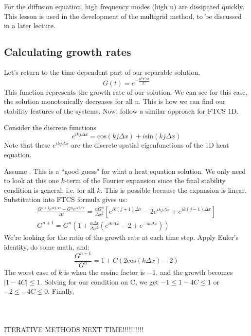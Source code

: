 \documentclass[11pt]{article}
\begin{document}
For the diffusion equation, high frequency modes (high n) are dissipated quickly. This lesson is used in the development of the multigrid method, to be discussed in a later lecture.

\subsection{Calculating growth rates}
Let's return to the time-dependent part of our separable solution,
$$ G(t) = e^{-\frac{n^2\pi^2\alpha t}{L^2}} $$
This function represents the growth rate of our solution. We can see for this case, the solution monotonically decreases for all n. This is how we can find our stability features of the systems. Now, follow a similar approach for FTCS 1D.

Consider the discrete functions
\begin{equation}
e^{ikj\Delta x} = \text{cos}(kj\Delta x) + i\text{sin}(kj\Delta x)
\end{equation}
Note that these $e^{ikj\Delta x}$ are the discrete spatial eigenfunctions of the 1D heat equation.  

Assume . This is a ``good guess" for what a heat equation solution. We only need to look at this one $k$-term of the Fourier expansion since the final stability condition is general, i.e. for all $k$.  This is possible because the expansion is linear. Substitution into FTCS formula gives us:
\begin{eqnarray}
\frac{G^{n+1}e^{ikj\Delta x} - G^ne^{ikj\Delta x} }{\Delta t} = \frac{\alpha G^n}{\Delta x^2}  [e^{ik(j+1)\Delta x} -2e^{ikj\Delta x}  + e^{ik(j-1)\Delta x} ] \\
G^{n+1} = G^n(1 + \frac{\alpha \Delta t}{\Delta x^2}  (e^{ik\Delta x} -2  + e^{-ik\Delta x} ))
\end{eqnarray}
We're looking for the ratio of the growth rate at each time step. Apply Euler's identity, do some math, and:
$$ \frac{G^{n+1}}{G^n} = 1+C(2\text{cos}(k\Delta x) - 2) $$
The worst case of $k$ is when the cosine factor is $-1$, and the growth becomes $|1-4C| \leq 1$. Solving for our condition on C, we get $ -1 \leq 1-4C \leq 1$ or $-2 \leq -4C \leq 0$. Finally, 
\\
\\
\\
\\
ITERATIVE METHODS NEXT TIME!!!!!!!!!!!
\end{document}
